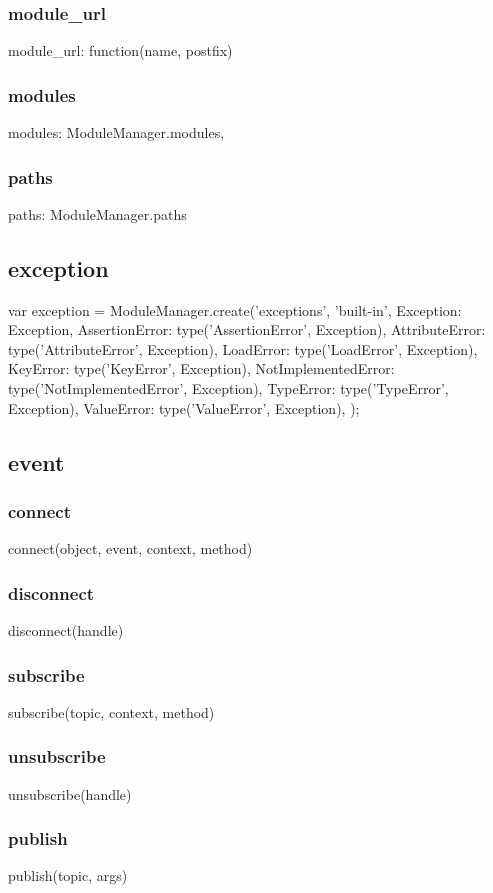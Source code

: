 \subsubsection*{module\_url}
module\_url: function(name, postfix) {
\subsubsection*{modules}
modules: ModuleManager.modules,
\subsubsection*{paths}
paths: ModuleManager.paths

\subsection{exception}
var exception = ModuleManager.create('exceptions', 'built-in', {
        Exception: Exception,
        AssertionError: type('AssertionError', Exception),
        AttributeError: type('AttributeError', Exception),
        LoadError: type('LoadError', Exception),
        KeyError: type('KeyError', Exception),
        NotImplementedError: type('NotImplementedError', Exception),
        TypeError: type('TypeError', Exception),
        ValueError: type('ValueError', Exception),
    });

\subsection{event}
\subsubsection*{connect}
connect(object, event, context, method) {
\subsubsection*{disconnect}
disconnect(handle) {
\subsubsection*{subscribe}
subscribe(topic, context, method) {
\subsubsection*{unsubscribe}
unsubscribe(handle) {
\subsubsection*{publish}
publish(topic, args) {
}}}}}}
